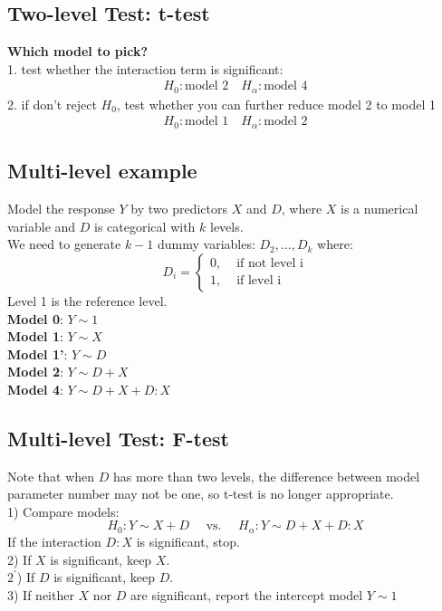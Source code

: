 \documentclass[11pt,a4paper]{article}
\begin{document}
\subsection{Two-level Test: t-test}
\textbf{Which model to pick?}\\
1. test whether the interaction term is significant:
\begin{equation}
    \begin{aligned}
        H_0 : \text{model 2}\quad H_\alpha : \text{model 4}
    \end{aligned}
    \nonumber
\end{equation}
2. if don't reject $H_0$, test whether you can further reduce model 2 to model 1
\begin{equation}
    \begin{aligned}
        H_0 : \text{model 1}\quad H_\alpha : \text{model 2}
    \end{aligned}
    \nonumber
\end{equation}

\subsection{Multi-level example}
Model the response $Y$ by two predictors $X$ and $D$, where $X$ is a numerical variable and $D$ is categorical with $k$ levels.\\
We need to generate $k-1$ dummy variables: $D_{2}, \ldots, D_{k}$ where:
$$
D_{i}= \begin{cases}0, & \text { if not level } \mathrm{i} \\ 1, & \text { if level } \mathrm{i}\end{cases}
$$
Level 1 is the reference level.\\
\textbf{Model 0}: $Y\sim  1$\\
\textbf{Model 1}: $Y\sim  X$\\
\textbf{Model 1'}: $Y\sim  D$\\
\textbf{Model 2}: $Y\sim  D+X$\\
\textbf{Model 4}: $Y\sim  D+X+D:X$\\

\subsection{Multi-level Test: F-test}
Note that when $D$ has more than two levels, the difference between model parameter number may not be one, so t-test is no longer appropriate.\\
1) Compare models:
$$
H_{0}: Y \sim X+D \quad \text { vs. } \quad H_{\alpha}: Y \sim D+X+D: X
$$
If the interaction $D: X$ is significant, stop.\\
2) If $X$ is significant, keep $X$.\\
$2^{\prime}$) If $D$ is significant, keep $D$.\\
3) If neither $X$ nor $D$ are significant, report the intercept model $Y \sim 1$\\
\end{document}
